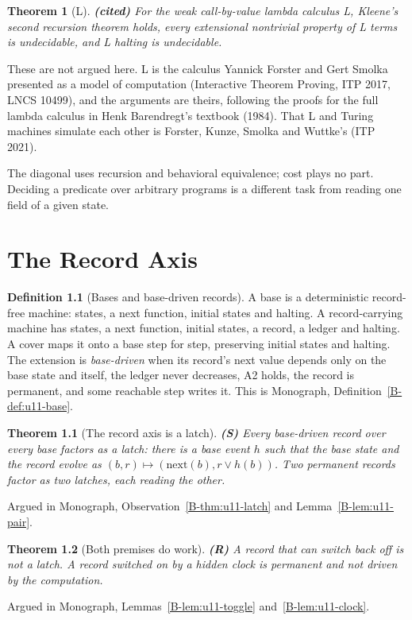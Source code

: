 \documentclass[11pt, a4paper]{report}
\theoremstyle{definition}
\newtheorem{definition}{Definition}[chapter]
\theoremstyle{plain}
\newtheorem{theorem}{Theorem}[chapter]
\begin{document}
\begin{theorem}[L] \textbf{(cited)}
For the weak call-by-value lambda calculus L, Kleene's second recursion theorem holds, every extensional nontrivial property of L terms is undecidable, and L halting is undecidable.
\end{theorem}
\noindent These are not argued here. L is the calculus Yannick Forster and Gert Smolka presented as a model of computation (Interactive Theorem Proving, ITP 2017, LNCS 10499), and the arguments are theirs, following the proofs for the full lambda calculus in Henk Barendregt's textbook (1984). That L and Turing machines simulate each other is Forster, Kunze, Smolka and Wuttke's (ITP 2021).

The diagonal uses recursion and behavioral equivalence; cost plays no part. Deciding a predicate over arbitrary programs is a different task from reading one field of a given state.

\chapter{The Record Axis}\label{ch:record}

\begin{definition}[Bases and base-driven records]
A base is a deterministic record-free machine: states, a next function, initial states and halting. A record-carrying machine has states, a next function, initial states, a record, a ledger and halting. A cover maps it onto a base step for step, preserving initial states and halting. The extension is \emph{base-driven} when its record's next value depends only on the base state and itself, the ledger never decreases, A2 holds, the record is permanent, and some reachable step writes it. This is Monograph, Definition~\ref{B-def:u11-base}.
\end{definition}

\begin{theorem}[The record axis is a latch] \textbf{(S)}
Every base-driven record over every base factors as a latch: there is a base event $h$ such that the base state and the record evolve as $(b, r) \mapsto (\mathrm{next}(b), r \vee h(b))$.
Two permanent records factor as two latches, each reading the other.
\end{theorem}
\noindent Argued in Monograph, Observation~\ref{B-thm:u11-latch} and Lemma~\ref{B-lem:u11-pair}.

\begin{theorem}[Both premises do work] \textbf{(R)}
A record that can switch back off is not a latch. A record switched on by a hidden clock is permanent and not driven by the computation.
\end{theorem}
\noindent Argued in Monograph, Lemmas~\ref{B-lem:u11-toggle} and~\ref{B-lem:u11-clock}.
\end{document}
